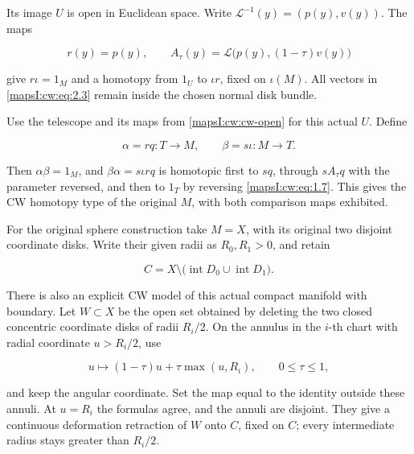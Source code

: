 \documentclass[11pt]{article}
\begin{document}
Its image \(U\) is open in Euclidean space. Write \(\mathcal L^{-1}(y)=(p(y),v(y))\). The maps

\begin{equation}
r(y)=p(y),\qquad
A_\tau(y)=\mathcal L\bigl(p(y),(1-\tau)v(y)\bigr)
\label{mapsI:cw:eq:2.3}
\end{equation}

give \(r\iota=1_M\) and a homotopy from \(1_U\) to \(\iota r\), fixed on \(\iota(M)\). All vectors in \eqref{mapsI:cw:eq:2.3} remain inside the chosen normal disk bundle.

Use the telescope and its maps from \cref{mapsI:cw:cw-open} for this actual \(U\). Define

\begin{equation}
\alpha=r q:T\longrightarrow M,\qquad
\beta=s\iota:M\longrightarrow T.
\label{mapsI:cw:eq:2.4}
\end{equation}

Then \(\alpha\beta=1_M\), and \(\beta\alpha=s\iota r q\) is homotopic first to \(s q\), through \(s A_\tau q\) with the parameter reversed, and then to \(1_T\) by reversing \eqref{mapsI:cw:eq:1.7}. This gives the CW homotopy type of the original \(M\), with both comparison maps exhibited.

For the original sphere construction take \(M=X\), with its original two disjoint coordinate disks. Write their given radii as \(R_0,R_1>0\), and retain

\begin{equation}
C=X\setminus\bigl(\operatorname{int}D_0\cup\operatorname{int}D_1\bigr).
\label{mapsI:cw:eq:2.5}
\end{equation}

There is also an explicit CW model of this actual compact manifold with boundary. Let \(W\subset X\) be the open set obtained by deleting the two closed concentric coordinate disks of radii \(R_i/2\). On the annulus in the \(i\)-th chart with radial coordinate \(u>R_i/2\), use

\begin{equation}
u\longmapsto(1-\tau)u+\tau\max(u,R_i),\qquad 0\leq\tau\leq1,
\label{mapsI:cw:eq:2.6}
\end{equation}

and keep the angular coordinate. Set the map equal to the identity outside these annuli. At \(u=R_i\) the formulas agree, and the annuli are disjoint. They give a continuous deformation retraction of \(W\) onto \(C\), fixed on \(C\); every intermediate radius stays greater than \(R_i/2\).
\end{document}
